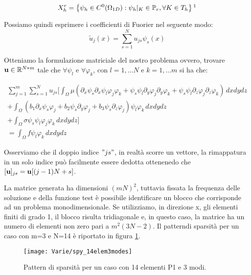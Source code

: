 \begin{equation}
\label{eq: spazio polinomiale}
X_h^r= \left\{\psi_h \in C^0(\Omega_{1D}): \psi_h \vert_K  \in \mathbb{P}_r,\forall K\in T_h \right\}\footnotemark
\end{equation}


Possiamo quindi esprimere i coefficienti di Fuorier nel seguente modo: 
\begin{equation}
\label{eq: coeff fourier espansi}
\tilde{u}_j(x)=\sum_{s=1}^Nu_{js}\psi_s(x)
\end{equation}

 
 Otteniamo la formulazione matriciale del nostro problema ovvero, trovare $\mathbf{u} \in \mathbb{R}^{N*m}$ tale che $\forall \psi_l$ e $\forall \varphi_k$, con $l=1,...N$ e $k=1,...m$ si ha che:

\begin{multline}
\sum_{j=1}^m \sum_{s=1}^N
u_{js} \Bigg[ \int_\Omega\mu( \partial_x\psi_s \partial_x\psi_l\varphi _j\varphi _k + \psi_s \psi_l \partial_y\varphi _j\partial_y\varphi _k + \psi_s \psi_l \partial_z\varphi _j\partial_z\varphi _k)\,dxdydz \\
+ \int_\Omega (b_1\partial_x\psi_s\varphi _j+b_2\psi_s\partial_y\varphi _j + b_3\psi_s\partial_z\varphi_j)\psi_l\varphi _k\,dxdydz\\ 
+\int_\Omega \sigma\psi_s\psi_l\varphi _j\varphi _k\,dxdydz \Bigg]\\
=\int_\Omega f\psi_l\varphi _k\,dxdydz
\end{multline}

 Osserviamo che il doppio indice $"js"$, in realt\`a scorre un vettore, la rimappatura in un solo indice pu\`o 
 facilmente essere dedotta ottenenedo che $[\mathbf{u}]_{js}=\mathbf{u}[(j-1)N+s]$. 
 
 La matrice generata ha dimensioni $(mN)^2$, tuttavia fissata la frequenza delle soluzione e della funzione test \`e 
 possibile identificare un blocco che corrisponde ad un problema monodimensionale.
 Se utilizziamo, in direzione x, gli elementi finiti di grado 1, il blocco risulta tridiagonale e, in questo caso, la matrice ha un numero di elementi non zero pari a $m^2(3N-2)$. Il pattern\footnotemark di sparsit\`a per un caso con m=3 e N=14 \`e riportato in figura \ref{fig:pattern}.
 
 \begin{figure}[h]
    \centering
    \texttt{[image: Varie/spy\_14elem3modes]}
    \caption{Pattern di sparsit\`a per un caso con 14 elementi P1 e 3 modi.}
    \label{fig:pattern}
\end{figure}

